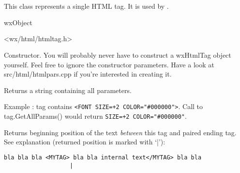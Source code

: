 %
%

\section{}\label{wxhtmltag}

This class represents a single HTML tag. 
It is used by .


wxObject


<wx/html/htmltag.h>


\label{wxhtmltagwxhtmltag}


Constructor. You will probably never have to construct a wxHtmlTag object
yourself. Feel free to ignore the constructor parameters.
Have a look at src/html/htmlpars.cpp if you're interested in creating it.

\label{wxhtmltaggetallparams}


Returns a string containing all parameters.

Example : tag contains {\tt <FONT SIZE=+2 COLOR="\#000000">}. Call to
tag.GetAllParams() would return {\tt SIZE=+2 COLOR="\#000000"}.


\label{wxhtmltaggetbeginpos}


Returns beginning position of the text {\it between} this tag and paired
ending tag. 
See explanation (returned position is marked with `|'):

\begin{verbatim}
bla bla bla <MYTAG> bla bla internal text</MYTAG> bla bla
                   |
\end{verbatim}


\label{wxhtmltaggetendpos1}


